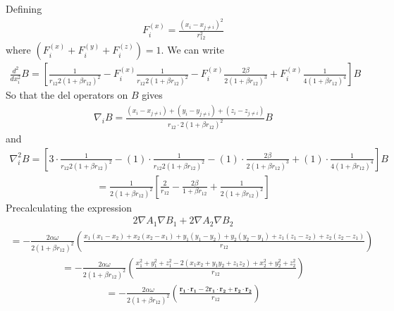\documentclass[12pt,english,a4paper]{article}
\begin{document}
Defining
\begin{align*}
    F_i^{(x)}=\frac{\left(x_i-x_{j\ne i}\right)^2}{r_{12}^2}
\end{align*}
where $\left(F_i^{(x)}+F_i^{(y)}+F_i^{(z)}\right)=1$. We can write
\begin{align*}
    \frac{d^2}{dx_i^2} B = \left[\frac{1}{r_{12}2\left(1+\beta r_{12}\right)^2}- F_i^{(x)}\frac{1}{r_{12}2\left(1+\beta r_{12}\right)^2}-F_i^{(x)}\frac{2\beta}{2\left(1+\beta r_{12}\right)^3}+F_i^{(x)}\frac{1}{4\left(1+\beta r_{12}\right)^4}\right]B
\end{align*}
So that the del operators on $B$ gives
\begin{align*}
    \nabla_i B = \frac{\left(x_i-x_{j\ne i}\right)+\left(y_i-y_{j\ne i}\right)+\left(z_i-z_{j\ne i}\right)}{r_{12}\cdot 2\left(1+\beta r_{12}\right)^2}B
\end{align*}
and
\begin{align*}
    \nabla_i^2 B = \left[3\cdot\frac{1}{r_{12}2\left(1+\beta r_{12}\right)^2}-\left(1\right)\cdot\frac{1}{r_{12}2\left(1+\beta r_{12}\right)^2}-\left(1\right)\cdot\frac{2\beta}{2\left(1+\beta r_{12}\right)^3}+\left(1\right)\cdot\frac{1}{4\left(1+\beta r_{12}\right)^4}\right]B
\end{align*}
\begin{align*}
    = \frac{1}{2\left(1+\beta r_{12}\right)^2}\left[\frac{2}{r_{12}}-\frac{2\beta}{1+\beta r_{12}}+\frac{1}{2\left(1+\beta r_{12}\right)^2}\right]
\end{align*}
Precalculating the expression
\begin{align*}
    2\nabla A_1\nabla B_1+2\nabla A_2\nabla B_2
\end{align*}
\begin{align*}
    =-\frac{2\alpha\omega}{2\left(1+\beta r_{12}\right)^2}\left(\frac{x_1\left(x_1-x_2\right)+x_2\left(x_2-x_1\right)+y_1\left(y_1-y_2\right)+y_2\left(y_2-y_1\right)+z_1\left(z_1-z_2\right)+z_2\left(z_2-z_1\right)}{r_{12}}\right)
\end{align*}
\begin{align*}
    = -\frac{2\alpha\omega}{2\left(1+\beta r_{12}\right)^2}\left(\frac{x_1^2+y_1^2+z_1^2-2\left(x_1x_2+y_1y_2+z_1z_2\right)+x_2^2+y_2^2+z_2^2}{r_{12}}\right)
\end{align*}
\begin{align*}
    = -\frac{2\alpha\omega}{2\left(1+\beta r_{12}\right)^2}\left(\frac{\boldsymbol{r_1}\cdot\boldsymbol{r_1}-2\boldsymbol{r_1}\cdot\boldsymbol{r_2}+\boldsymbol{r_2}\cdot\boldsymbol{r_2}}{r_{12}}\right)
\end{align*}
\end{document}

